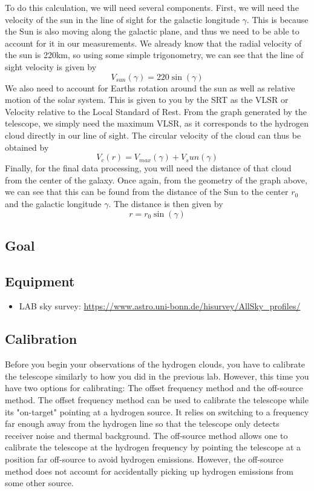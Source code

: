 To do this calculation, we will need several components. First, we will need the velocity of the sun in the line of sight for the galactic longitude $\gamma$. This is because the Sun is also moving along the galactic plane, and thus we need to be able to account for it in our measurements. We already know that the radial velocity of the sun is 220km, so using some simple trigonometry, we can see that the line of sight velocity is given by $$V_{sun}(\gamma) = 220\sin(\gamma)$$ We also need to account for Earths rotation around the sun as well as relative motion of the solar system. This is given to you by the SRT as the VLSR or Velocity relative to the Local Standard of Rest. From the graph generated by the telescope, we simply need the maximum VLSR, as it corresponds to the hydrogen cloud directly in our line of sight. The circular velocity of the cloud can thus be obtained by  $$V_c(r) = V_{max}(\gamma) + V_sun(\gamma)$$ Finally, for the final data processing, you will need the distance of that cloud from the center of the galaxy. Once again, from the geometry of the graph above, we can see that this can be found from the distance of the Sun to the center $r_0$ and the galactic longitude $\gamma$. The distance is then given by $$r = r_0 \sin(\gamma)$$



\subsection{Goal}

\subsection{Equipment}
\begin{itemize}
	\item LAB sky survey: \url{https://www.astro.uni-bonn.de/hisurvey/AllSky_profiles/}
\end{itemize}


\subsection{Calibration}
Before you begin your observations of the hydrogen clouds, you have to calibrate the telescope similarly to how you did in the previous lab. However, this time you have two options for calibrating: The offset frequency method and the off-source method. The offset frequency method can be used to calibrate the telescope while its "on-target" pointing at a hydrogen source. It relies on switching to a frequency far enough away from the hydrogen line so that the telescope only detects receiver noise and thermal background. The off-source method allows one to calibrate the telescope at the hydrogen frequency by pointing the telescope at a position far off-source to avoid hydrogen emissions. However, the off-source method does not account for accidentally picking up hydrogen emissions from some other source. 


